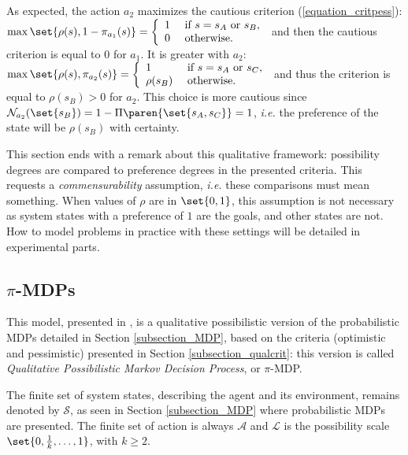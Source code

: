 As expected, the action $a_2$ maximizes the cautious criterion (\ref{equation_critpess}):
$\max \set{ \rho(s), 1-\pi_{a_1}(s) } = \left \{ \begin{array}{ll}
1 & \mbox{ if } s=s_A \mbox{ or } s_B, \\
0 & \mbox{ otherwise. }
\end{array}  \right.$ and then the cautious criterion 
is equal to $0$ for $a_1$.
It is greater with $a_2$: 
$\max \set{ \rho(s), \pi_{a_2}(s) } = \left \{ \begin{array}{ll}
1 &  \mbox{ if } s=s_A \mbox{ or } s_C, \\
\rho(s_B) & \mbox{ otherwise. }
\end{array}  \right.$ and thus the criterion is equal to $\rho(s_B)>0$ for $a_2$.
This choice is more cautious since $\mathcal{N}_{a_2}(\set{ s_B} ) = 1-\Pi \paren{ \set{ s_A , s_C } } = 1$, 
\textit{i.e.} the preference of the state will be $\rho(s_B)$ with certainty.

This section ends with a remark about this qualitative framework:
possibility degrees are compared to preference degrees in the presented criteria.
This requests a \textit{commensurability} assumption,
\textit{i.e.} these comparisons must mean something. 
When values of $\rho$ are in $\set{ 0 , 1 }$, 
this assumption is not necessary as system states with a preference of $1$
are the goals, and other states are not.
How to model problems in practice 
with these settings will be detailed in experimental parts.
\subsection{$\pi$-MDPs}
\label{subsection_piMDPs}
This model, presented in \cite{Sabbadin2001287,conf/ecai/Sabbadi00,Sabbadin:1999:pipomdp}, 
is a qualitative possibilistic version of the probabilistic MDPs detailed in Section \ref{subsection_MDP},
based on the criteria (optimistic and pessimistic) presented in Section \ref{subsection_qualcrit}:
this version is called \textit{Qualitative Possibilistic Markov Decision Process}, or $\pi$-MDP.

The finite set of system states, describing the agent and its environment, 
remains denoted by $\mathcal{S}$, as seen in Section \ref{subsection_MDP} 
where probabilistic MDPs are presented.
The finite set of action is always $\mathcal{A}$ 
and $\mathcal{L}$ is the possibility scale $\set{ 0, \frac{1}{k}, \ldots, 1 }$,
with $k\geqslant2$.

